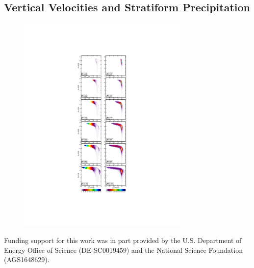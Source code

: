 \documentclass[times]{qjrms4}
\begin{document}
\subsection{Vertical Velocities and Stratiform Precipitation}

\begin{figure}[t]
\begin{center}
\noindent\includegraphics[width=20pc,angle=0]{figs/temp_pdecomp.pdf}\\
\end{center}
\caption{}
\label{fig:prdecomp}
\end{figure}

\ack 
Funding support for this work was in part provided by the U.S. Department of Energy Office of Science (DE-SC0019459) and the National Science Foundation (AGS1648629).



\end{document}
